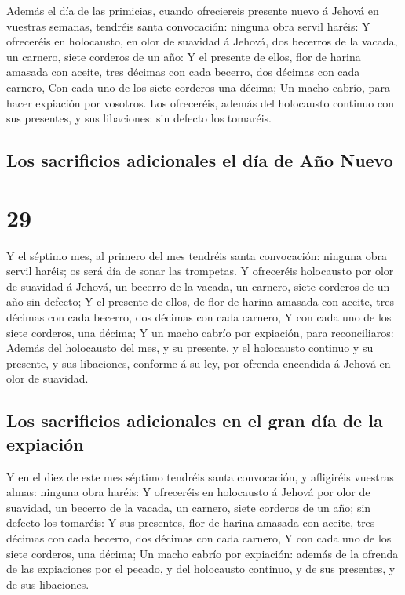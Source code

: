  Además el día de las primicias, cuando ofreciereis
presente nuevo á Jehová en vuestras semanas, tendréis santa convocación:
ninguna obra servil haréis:  Y ofreceréis en holocausto, en
olor de suavidad á Jehová, dos becerros de la vacada, un carnero, siete
corderos de un año:  Y el presente de ellos, flor de harina
amasada con aceite, tres décimas con cada becerro, dos décimas con cada
carnero,  Con cada uno de los siete corderos una décima;
 Un macho cabrío, para hacer expiación por vosotros.
 Los ofreceréis, además del holocausto continuo con sus
presentes, y sus libaciones: sin defecto los tomaréis.

\hypertarget{los-sacrificios-adicionales-el-duxeda-de-auxf1o-nuevo}{%
\subsection{Los sacrificios adicionales el día de Año
Nuevo}\label{los-sacrificios-adicionales-el-duxeda-de-auxf1o-nuevo}}

\hypertarget{section-28}{%
\section{29}\label{section-28}}

 Y el séptimo mes, al primero del mes tendréis santa
convocación: ninguna obra servil haréis; os será día de sonar las
trompetas.  Y ofreceréis holocausto por olor de suavidad á
Jehová, un becerro de la vacada, un carnero, siete corderos de un año
sin defecto;  Y el presente de ellos, de flor de harina
amasada con aceite, tres décimas con cada becerro, dos décimas con cada
carnero,  Y con cada uno de los siete corderos, una décima;
 Y un macho cabrío por expiación, para reconciliaros:
 Además del holocausto del mes, y su presente, y el
holocausto continuo y su presente, y sus libaciones, conforme á su ley,
por ofrenda encendida á Jehová en olor de suavidad.

\hypertarget{los-sacrificios-adicionales-en-el-gran-duxeda-de-la-expiaciuxf3n}{%
\subsection{Los sacrificios adicionales en el gran día de la
expiación}\label{los-sacrificios-adicionales-en-el-gran-duxeda-de-la-expiaciuxf3n}}

 Y en el diez de este mes séptimo tendréis santa
convocación, y afligiréis vuestras almas: ninguna obra haréis:
 Y ofreceréis en holocausto á Jehová por olor de suavidad,
un becerro de la vacada, un carnero, siete corderos de un año; sin
defecto los tomaréis:  Y sus presentes, flor de harina
amasada con aceite, tres décimas con cada becerro, dos décimas con cada
carnero,  Y con cada uno de los siete corderos, una décima;
 Un macho cabrío por expiación: además de la ofrenda de las
expiaciones por el pecado, y del holocausto continuo, y de sus
presentes, y de sus libaciones.

